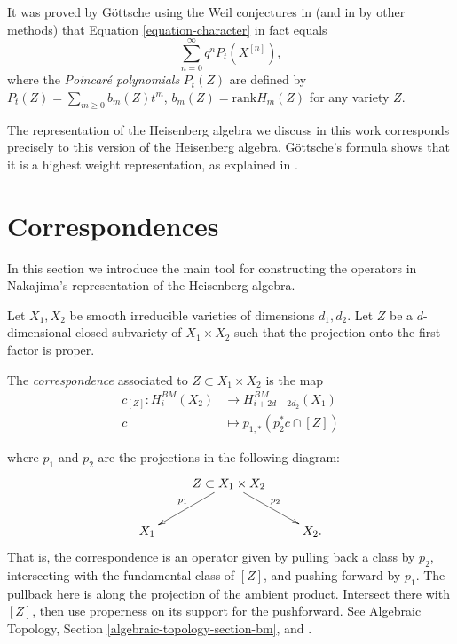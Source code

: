 \noindent
It was proved by Göttsche using the Weil
conjectures in \cite{gottsche1990betti}
(and in \cite[Section
6.2]{Nakajima-lectures} by other methods)
that Equation \ref{equation-character}
in fact equals
$$
\sum_{n=0}^\infty q^nP_t(X^{[n]}),
$$
where the {\it Poincaré polynomials}
$P_t(Z)$ are defined by
$P_t(Z)=\sum_{m\geq 0}b_m(Z)t^m$,
$b_m(Z)=\text{rank}H_m(Z)$ for
any variety $Z$.

The representation
of the Heisenberg algebra we discuss in this
work corresponds
precisely to this version of the Heisenberg
algebra.
Göttsche's formula shows that it is a
highest weight representation,
as explained in \cite[Corollary
8.16]{Nakajima-lectures}.






\section{Correspondences}
\label{section-correspondences}

\noindent
In this section we introduce the main tool
for constructing the operators in Nakajima's
representation
of the Heisenberg algebra.

\medskip\noindent
Let $X_1,X_2$ be smooth irreducible varieties
of dimensions $d_1,d_2$.
Let $Z$ be a $d$-dimensional
closed subvariety of $X_1\times X_2$
such that the projection onto the first
factor
is proper.

The {\it correspondence} associated to $Z
\subset X_1\times X_2$
is the map
\begin{equation}
\label{equation-correspondence}
\begin{aligned}
c_{[Z]}:H_i^{BM}(X_2)&\longrightarrow
H_{i+2d-2d_2}^{BM}(X_1)\\
c&\longmapsto p_{1,*}(p_2^*c\cap [Z])
\end{aligned}
\end{equation}

\noindent
where $p_1$ and $p_2$ are the projections in
the following diagram:
$$
\xymatrix{
&Z\ar[ld]_{p_1}\ar[rd]^{p_2} \subset
X_1\times X_2\\
X_1&&X_2.
}
$$
\noindent
That is, the correspondence is an operator
given by pulling back a class by $p_2$,
intersecting with the fundamental class of
$[Z]$,
and pushing forward by $p_1$.
The pullback here is along the projection of
the ambient product. Intersect there with
$[Z]$, then use properness on its support
for the pushforward. See Algebraic Topology,
Section \ref{algebraic-topology-section-bm},
and \cite[Section 8.2]{Nakajima-lectures}.

